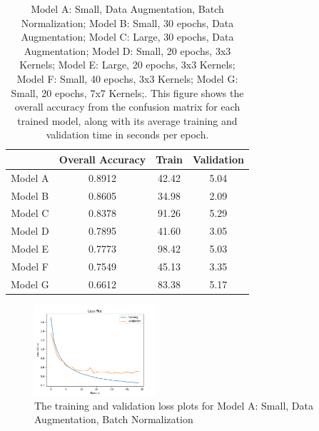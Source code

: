\documentclass[11pt,a4paper]{article}
\begin{document}

 \begin{table}
    \centering
    \begin{tabular}{ |c|c|c|c| } 
     \hline
      & Overall Accuracy & Train & Validation \\
     \hline
     Model A & 0.8912 & 42.42 & 5.04 \\ 
     \hline
     Model B & 0.8605 & 34.98 & 2.09 \\ 
     \hline
     Model C & 0.8378 & 91.26 & 5.29 \\ 
     \hline
     Model D & 0.7895 & 41.60 & 3.05 \\ 
     \hline
     Model E & 0.7773 & 98.42 & 5.03 \\ 
     \hline
     Model F & 0.7549 & 45.13 & 3.35 \\ 
     \hline
     Model G & 0.6612 & 83.38 & 5.17 \\ 
     \hline
     
    
    \end{tabular}
    \caption{Model A: Small, Data Augmentation, Batch Normalization; Model B: Small, 30 epochs, Data Augmentation; Model C: Large, 30 epochs, Data Augmentation;
    Model D: Small, 20 epochs, 3x3 Kernels; Model E: Large, 20 epochs, 3x3 Kernels; 
    Model F: Small, 40 epochs, 3x3 Kernels; Model G: Small, 20 epochs, 7x7 Kernels;. This figure shows the overall accuracy from the confusion matrix 
    for each trained model, along with its average training and validation time in seconds per epoch.}
    \label{tab:table1}
\end{table}

\begin{figure}
  \centering
  \includegraphics[width=0.40\textwidth]{figures/plots.png}
  \caption{The training and validation loss plots for Model A: Small, Data Augmentation, Batch Normalization}
  \label{fig:plots}
\end{figure}
\end{document}
